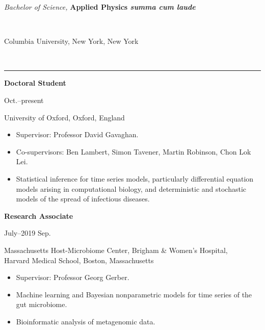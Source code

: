\documentclass[11pt]{article}
\begin{document}
\noindent\parbox{.75\textwidth}{\raggedright \emph{Bachelor of Science,} \textbf{Applied Physics \emph{summa cum laude}}}
\parbox{.25\textwidth}{\raggedleft  ~}
Columbia University, New York, New York



\vspace{0.6cm}

\vspace{-2.75mm} \\
\rule{\textwidth}{0.4pt}
\vspace{0.1mm}
\noindent\parbox{.75\textwidth}{\raggedright \textbf{Doctoral Student}}
\parbox{.25\textwidth}{ Oct.--present}
University of Oxford, Oxford, England
\vspace{-.25cm}
\begin{itemize}
\item Supervisor: Professor David Gavaghan.
\vspace{-.3cm}
\item Co-supervisors: Ben Lambert, Simon Tavener, Martin Robinson, Chon Lok Lei.
\vspace{-.3cm}
\item Statistical inference for time series models, particularly differential equation models arising in computational biology, and deterministic and stochastic models of the spread of infectious diseases.
\end{itemize}

\vspace{0.2cm}

\noindent\parbox{.75\textwidth}{\raggedright \textbf{Research Associate}}
\parbox{.25\textwidth}{ July--2019 Sep.}
Massachusetts Host-Microbiome Center, Brigham \& Women's Hospital,\\ Harvard Medical School, Boston, Massachusetts
\vspace{-.25cm}
\begin{itemize}
\item Supervisor: Professor Georg Gerber.
\vspace{-.3cm}
\item Machine learning and Bayesian nonparametric models for time series of the gut microbiome.
\vspace{-.3cm}
\item Bioinformatic analysis of metagenomic data.
\end{itemize}

\vspace{0.2cm}
\end{document}
